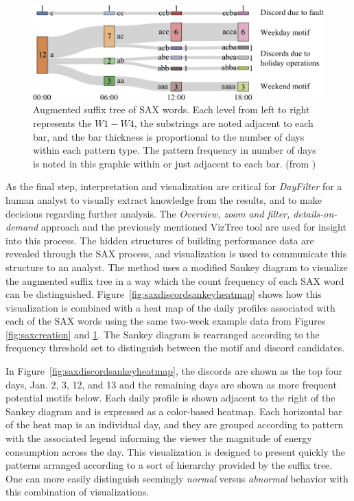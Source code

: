 \begin{figure}[ht!]
\begin{center}
\includegraphics[width=0.84\columnwidth]{figures/DiscordSankeyExample/DiscordSankeyExample}
\caption{Augmented suffix tree of SAX words. Each level from left to right represents the $W1-W4$, the substrings are noted adjacent to each bar, and the bar thickness is proportional to the number of days within each pattern type. The pattern frequency in number of days is noted in this graphic within or just adjacent to each bar. (from \citep{miller_automated_2015})
\label{fig:saxdiscordsankey}%
}
\end{center}
\end{figure}

As the final step, interpretation and visualization are critical for \emph{DayFilter} for a human analyst to visually extract knowledge from the results, and to make decisions regarding further analysis. The \emph{Overview, zoom and filter, details-on-demand} approach \citep{shneiderman_eyes_1996} and the previously mentioned VizTree tool \citep{lin_visually_2004} are used for insight into this process. The hidden structures of building performance data are revealed through the SAX process, and visualization is used to communicate this structure to an analyst. The method uses a modified Sankey diagram to visualize the augmented suffix tree in a way which the count frequency of each SAX word can be distinguished.  Figure~\ref{fig:saxdiscordsankeyheatmap} shows how this visualization is combined with a heat map of the daily profiles associated with each of the SAX words using the same two-week example data from Figures \ref{fig:saxcreation} and \ref{fig:saxdiscordsankey}. The Sankey diagram is rearranged according to the frequency threshold set to distinguish between the motif and discord candidates.

In Figure~\ref{fig:saxdiscordsankeyheatmap}, the discords are shown as the top four days, Jan. 2, 3, 12, and 13 and the remaining days are shown as more frequent potential motifs below. Each daily profile is shown adjacent to the right of the Sankey diagram and is expressed as a color-based heatmap. Each horizontal bar of the heat map is an individual day, and they are grouped according to pattern with the associated legend informing the viewer the magnitude of energy consumption across the day. This visualization is designed to present quickly the patterns arranged according to a sort of hierarchy provided by the suffix tree. One can more easily distinguish seemingly \emph{normal} versus \emph{abnormal} behavior with this combination of visualizations. 

